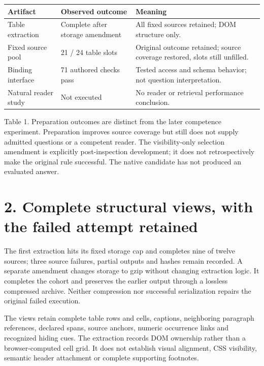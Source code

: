 \documentclass[10pt,a4paper]{article}
\begin{document}
\begin{longtable}{@{}p{}p{}p{}@{}}\toprule
\textbf{Artifact} & \textbf{Observed outcome} & \textbf{Meaning} \\ \midrule\endhead
Table extraction & Complete after storage amendment & All fixed sources retained; DOM structure only. \\
Fixed source pool & 21 / 24 table slots & Original outcome retained; source coverage restored, slots still unfilled. \\
Binding interface & 71 authored checks pass & Tested access and schema behavior; not question interpretation. \\
Natural reader study & Not executed & No reader or retrieval performance conclusion. \\
\bottomrule\end{longtable}
{\small Table 1. Preparation outcomes are distinct from the later competence experiment.}
Preparation improves source coverage but still does not supply admitted questions or a competent reader. The visibility-only selection amendment is explicitly post-inspection development; it does not retrospectively make the original rule successful. The native candidate has not produced an evaluated answer.

\clearpage
\section*{2. Complete structural views, with the failed attempt retained}
The first extraction hits its fixed storage cap and completes nine of twelve sources; three source failures, partial outputs and hashes remain recorded. A separate amendment changes storage to gzip without changing extraction logic. It completes the cohort and preserves the earlier output through a lossless compressed archive. Neither compression nor successful serialization repairs the original failed execution.

The views retain complete table rows and cells, captions, neighboring paragraph references, declared spans, source anchors, numeric occurrence links and recognized hiding cues. The extraction records DOM ownership rather than a browser-computed cell grid. It does not establish visual alignment, CSS visibility, semantic header attachment or complete supporting footnotes.
\end{document}
